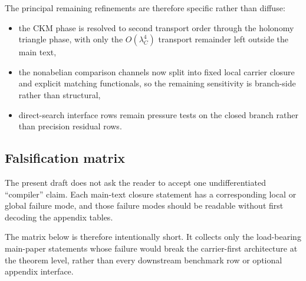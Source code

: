 \documentclass[11pt,a4paper]{article}
\theoremstyle{definition}
\theoremstyle{remark}
\begin{document}
The principal remaining refinements are therefore specific rather than diffuse:
\begin{itemize}[leftmargin=1.5em, topsep=3pt, itemsep=2pt]
    \item the CKM phase is resolved to second transport order through the holonomy triangle phase, with only the $O(\lambda_C^4)$ transport remainder left outside the main text,
    \item the nonabelian comparison channels now split into fixed local carrier closure and explicit matching functionals, so the remaining sensitivity is branch-side rather than structural,
    \item direct-search interface rows remain pressure tests on the closed branch rather than precision residual rows.
\end{itemize}

\subsection{Falsification matrix}

The present draft does not ask the reader to accept one undifferentiated \enquote{compiler} claim. Each main-text closure statement has a corresponding local or global failure mode, and those failure modes should be readable without first decoding the appendix tables.

The matrix below is therefore intentionally short. It collects only the load-bearing main-paper statements whose failure would break the carrier-first architecture at the theorem level, rather than every downstream benchmark row or optional appendix interface.
\end{document}
